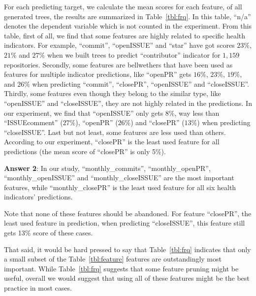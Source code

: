 \documentclass[smallextended]{svjour3}
\newcommand{\tbl}[1]{Table~\ref{tbl:#1}}
\newcommand{\BLACK}{\color{black}}
\begin{document}
For each predicting target, we calculate the mean scores for each feature, of all generated trees, the results are summarized in  Table~\ref{tbl:frq}. 
In this table, ``n/a''  denotes the dependent variable which is not counted in the experiment. From this table, first of all, we find that some features are highly related to specific health indicators. For example, ``commit'', ``openISSUE'' and  ``star'' have got scores  $23\%$,  $21\%$ and  $27\%$  when we built trees to predict ``contributor'' indicator for $1,159$ repositories.  Secondly, some features are bellwethers that have been used as features for multiple indicator predictions, like ``openPR'' gets $16\%$, $23\%$, $19\%$, and $26\%$ when predicting ``commit'', ``closePR'', ``openISSUE'' and ``closeISSUE''. Thirdly, some features even though they belong to the similar type, like ``openISSUE'' and ``closeISSUE'', they are not highly related in the predictions. In our experiment, we find that  ``openISSUE'' only gets $8\%$, way less than ``ISSUEcomment'' ($27\%$), ``openPR'' ($26\%$) and ``closePR'' ($13\%$) when predicting ``closeISSUE''. Last but not least,  some features are less used than others. According to our experiment, ``closePR'' is the least used feature for all predictions (the mean score of ``closePR'' is only 5\%).

\BLACK

\begin{blockquote}
\noindent
\textbf{Answer 2}: In our study, ``monthly\_commits'', ``monthly\_openPR'', ``monthly\_openISSUE'' and ``monthly\_closeISSUE'' are the most important features, while ``monthly\_closePR'' is the least used feature for all six health indicators' predictions.
\end{blockquote}

Note that none of these features should be abandoned. For feature ``closePR'', the least used feature in prediction, when predicting ``closeISSUE'', this feature still gets 13\% score of these cases.

 That said, it would be hard pressed to say
 that Table~\ref{tbl:frq} indicates that only a small subset of the \tbl{feature} features are outstandingly most important. While Table~\ref{tbl:frq} suggests that some feature pruning might be useful, overall we would suggest that using all of these features might be the best practice in most cases.
\end{document}
